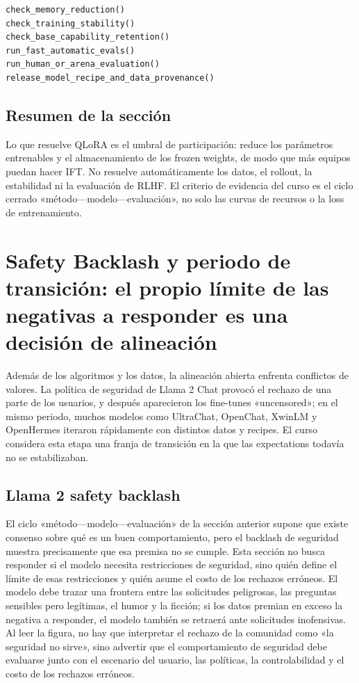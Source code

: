 \documentclass[a4paper]{article}
\begin{document}
\begin{lstlisting}[caption={Compuertas de validación: de un método eficiente a la publicación de un modelo confiable}]
check_memory_reduction()
check_training_stability()
check_base_capability_retention()
run_fast_automatic_evals()
run_human_or_arena_evaluation()
release_model_recipe_and_data_provenance()
\end{lstlisting}

\subsection{Resumen de la sección}

Lo que resuelve QLoRA es el umbral de participación: reduce los parámetros entrenables y el almacenamiento de los frozen weights, de modo que más equipos puedan hacer IFT. No resuelve automáticamente los datos, el rollout, la estabilidad ni la evaluación de RLHF. El criterio de evidencia del curso es el ciclo cerrado «método—modelo—evaluación», no solo las curvas de recursos o la loss de entrenamiento.
\section{Safety Backlash y periodo de transición: el propio límite de las negativas a responder es una decisión de alineación}

Además de los algoritmos y los datos, la alineación abierta enfrenta conflictos de valores. La política de seguridad de Llama 2 Chat provocó el rechazo de una parte de los usuarios, y después aparecieron los fine-tunes «uncensored»; en el mismo periodo, muchos modelos como UltraChat, OpenChat, XwinLM y OpenHermes iteraron rápidamente con distintos datos y recipes. El curso considera esta etapa una franja de transición en la que las expectations todavía no se estabilizaban.

\subsection{Llama 2 safety backlash}

El ciclo «método—modelo—evaluación» de la sección anterior supone que existe consenso sobre qué es un buen comportamiento, pero el backlash de seguridad muestra precisamente que esa premisa no se cumple. Esta sección no busca responder si el modelo necesita restricciones de seguridad, sino quién define el límite de esas restricciones y quién asume el costo de los rechazos erróneos. El modelo debe trazar una frontera entre las solicitudes peligrosas, las preguntas sensibles pero legítimas, el humor y la ficción; si los datos premian en exceso la negativa a responder, el modelo también se retraerá ante solicitudes inofensivas. Al leer la figura, no hay que interpretar el rechazo de la comunidad como «la seguridad no sirve», sino advertir que el comportamiento de seguridad debe evaluarse junto con el escenario del usuario, las políticas, la controlabilidad y el costo de los rechazos erróneos.
\end{document}
